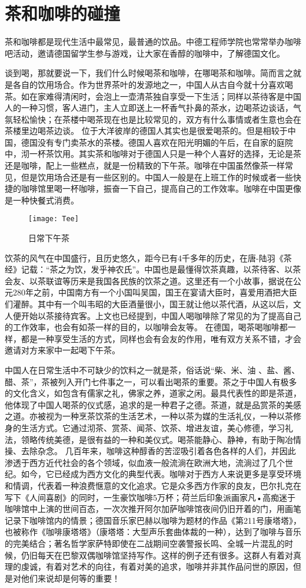 \section{茶和咖啡的碰撞}
茶和咖啡都是现代生活中最常见，最普通的饮品。中德工程师学院也常常举办咖啡吧活动，邀请德国留学生参与游戏，让大家在香醇的咖啡中，了解德国文化。 

谈到喝，那就要说一下，我们什么时候喝茶和咖啡，在哪喝茶和咖啡。简而言之就是各自的饮用场合。作为世界茶叶的发源地之一，中国人从古自今就十分喜欢喝茶。如在家难得清闲时，会泡上一壶清茶独自享受一下生活；同样以茶待客是中国人的一种习惯，客人进门，主人立即送上一杯香气扑鼻的茶水，边喝茶边谈话，气氛轻松愉快；在茶楼中喝茶现在也是比较常见的，双方有什么事情或者生意也会在茶楼里边喝茶边谈。
位于大洋彼岸的德国人其实也是很爱喝茶的。但是相较于中国，德国没有专门卖茶水的茶楼。德国人喜欢在阳光明媚的午后，在自家的庭院中，沏一杯茶饮用。其实茶和咖啡对于德国人只是一种个人喜好的选择，无论是茶还是咖啡，配上一些糕点，就是一份精致的下午茶。咖啡在中国虽然像茶一样常见，但是饮用场合还是有一些区别的。中国人一般是在上班工作的时候或者一些快捷的咖啡馆里喝一杯咖啡，振奋一下自己，提高自己的工作效率。咖啡在中国更像是一种快餐式消费。
\begin{figure}
    \centering
    \texttt{[image: Tee]}
    \caption{日常下午茶}
\end{figure}
饮茶的风气在中国盛行，且历史悠久，距今已有4千多年的历史，在唐-陆羽《茶经》记载：“茶之为饮，发乎神农氏”。中国也是最懂得饮茶真趣，以茶待客、以茶会友、以茶联谊等历来是我国各民族的饮茶之道。这里还有一个小故事，据说在公元280年之前，中国南方有一个小国叫吴国，国王在宴请大臣时，喜爱用酒把大臣们灌醉。其中有一个叫韦昭的大臣酒量很小，国王就让他以茶代酒，从这以后，文人便开始以茶接待宾客。上文也已经提到，中国人喝咖啡除了常见的为了提高自己的工作效率，也会有如茶一样的目的，以咖啡会友等。
在德国，喝茶喝咖啡都一样，都是一种享受生活的方式，同样也会有会友的作用，唯有双方关系不错，才会邀请对方来家中一起喝下午茶。

中国人在日常生活中不可缺少的饮料之一就是茶，俗话说“柴、米、油 、盐、酱、醋、茶”，茶被列入开门七件事之一，可以看出喝茶的重要。茶之于中国人有极多的文化含义，如包含有儒家之礼，佛家之养，道家之闲。最具代表性的即是茶道，他体现了中国人喝茶的仪式感，追求的是一种君子之德。茶道，就是品赏茶的美感之道。亦被视为一种烹茶饮茶的生活艺术，一种以茶为媒的生活礼仪，一种以茶修身的生活方式。它通过沏茶、赏茶、闻茶、饮茶、增进友谊，美心修德，学习礼法，领略传统美德，是很有益的一种和美仪式。喝茶能静心、静神，有助于陶冶情操、去除杂念。
几百年来，咖啡这种醇香的苦涩吸引着各色各样的人们，并因此渗透于西方近代社会的各个领域，似血液一般流淌在欧洲大地，流淌过了几个世纪。如今，它已经成为西方文化的典型代表。咖啡对于西方人来说更多是享受环境和情调，代表着一种浪费惬意的文化追求。它是众多西方作家的良友，巴尔扎克在写下《人间喜剧》的同时，一生豪饮咖啡5万杯；荷兰后印象派画家凡•高痴迷于咖啡馆中上演的世间百态，一次次推开阿尔加萨咖啡馆夜间仍旧开着的门，用画笔记录下咖啡馆内的情景；德国音乐家巴赫以咖啡为题材的作品《第211号康塔塔》，也被称作《咖啡康塔塔》（康塔塔：大型声乐套曲体裁的一种），达到了咖啡与音乐的完美结合；著名哲学家萨特即使在二战期间空袭警报长鸣、全城一片混乱的时候，仍旧每天在巴黎双偶咖啡馆坚持写作。这样的例子还有很多。这群人有着对真理的虔诚，有着对艺术的向往，有着对美的追求，咖啡并非其作品问世的原因，但是对他们来说却是何等的重要！
